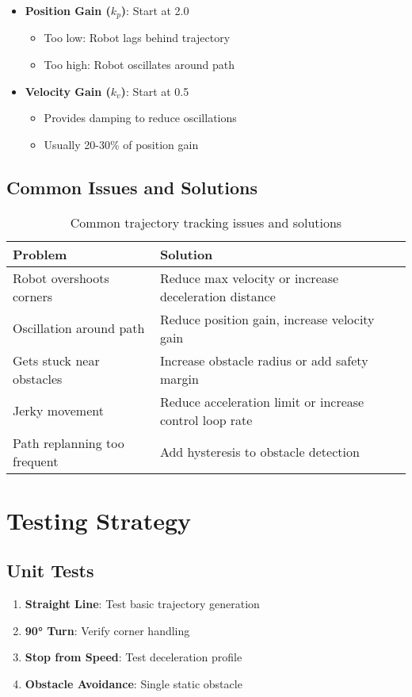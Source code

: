 \documentclass[12pt,a4paper]{article}
\begin{document}
\begin{itemize}
    \item \textbf{Position Gain ($k_p$)}: Start at 2.0
        \begin{itemize}
            \item Too low: Robot lags behind trajectory
            \item Too high: Robot oscillates around path
        \end{itemize}
    \item \textbf{Velocity Gain ($k_v$)}: Start at 0.5
        \begin{itemize}
            \item Provides damping to reduce oscillations
            \item Usually 20-30\% of position gain
        \end{itemize}
\end{itemize}

\subsection{Common Issues and Solutions}

\begin{table}[h]
\centering
\begin{tabular}{|p{4cm}|p{7cm}|}
\hline
\textbf{Problem} & \textbf{Solution} \\
\hline
Robot overshoots corners & Reduce max velocity or increase deceleration distance \\
\hline
Oscillation around path & Reduce position gain, increase velocity gain \\
\hline
Gets stuck near obstacles & Increase obstacle radius or add safety margin \\
\hline
Jerky movement & Reduce acceleration limit or increase control loop rate \\
\hline
Path replanning too frequent & Add hysteresis to obstacle detection \\
\hline
\end{tabular}
\caption{Common trajectory tracking issues and solutions}
\end{table}

\section{Testing Strategy}

\subsection{Unit Tests}
\begin{enumerate}
    \item \textbf{Straight Line}: Test basic trajectory generation
    \item \textbf{90° Turn}: Verify corner handling  
    \item \textbf{Stop from Speed}: Test deceleration profile
    \item \textbf{Obstacle Avoidance}: Single static obstacle
\end{enumerate}
\end{document}
